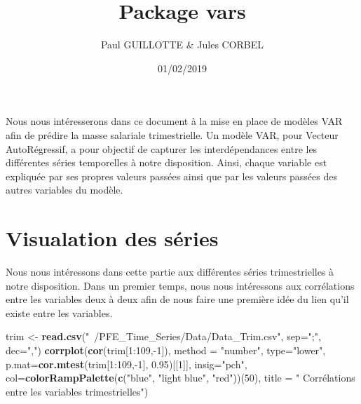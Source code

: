 \documentclass[11pt,]{article}
\title{Package vars}
\author{Paul GUILLOTTE \& Jules CORBEL}
\date{01/02/2019}
\newenvironment{Shaded}{\begin{snugshade}}{\end{snugshade}}
\newcommand{\KeywordTok}[1]{\textcolor[rgb]{0.13,0.29,0.53}{\textbf{{#1}}}}
\newcommand{\DataTypeTok}[1]{\textcolor[rgb]{0.13,0.29,0.53}{{#1}}}
\newcommand{\DecValTok}[1]{\textcolor[rgb]{0.00,0.00,0.81}{{#1}}}
\newcommand{\FloatTok}[1]{\textcolor[rgb]{0.00,0.00,0.81}{{#1}}}
\newcommand{\StringTok}[1]{\textcolor[rgb]{0.31,0.60,0.02}{{#1}}}
\newcommand{\NormalTok}[1]{{#1}}
\begin{document}
\maketitle

{
\setcounter{tocdepth}{2}
\tableofcontents
}
Nous nous intéresserons dans ce document à la mise en place de modèles
VAR afin de prédire la masse salariale trimestrielle. Un modèle VAR,
pour Vecteur AutoRégressif, a pour objectif de capturer les
interdépendances entre les différentes séries temporelles à notre
disposition. Ainsi, chaque variable est expliquée par ses propres
valeurs passées ainsi que par les valeurs passées des autres variables
du modèle.

\section{Visualation des séries}\label{visualation-des-series}

Nous nous intéressons dans cette partie aux différentes séries
trimestrielles à notre disposition. Dans un premier temps, nous nous
intéressons aux corrélations entre les variables deux à deux afin de
nous faire une première idée du lien qu'il existe entre les variables.

\begin{Shaded}
\begin{Highlighting}[]
\NormalTok{trim <-}\StringTok{ }\KeywordTok{read.csv}\NormalTok{(}\StringTok{"~/PFE_Time_Series/Data/Data_Trim.csv"}\NormalTok{, }\DataTypeTok{sep=}\StringTok{";"}\NormalTok{, }\DataTypeTok{dec=}\StringTok{","}\NormalTok{)}
\KeywordTok{corrplot}\NormalTok{(}\KeywordTok{cor}\NormalTok{(trim[}\DecValTok{1}\NormalTok{:}\DecValTok{109}\NormalTok{,-}\DecValTok{1}\NormalTok{]), }\DataTypeTok{method =} \StringTok{"number"}\NormalTok{, }\DataTypeTok{type=}\StringTok{"lower"}\NormalTok{,}
         \DataTypeTok{p.mat=}\KeywordTok{cor.mtest}\NormalTok{(trim[}\DecValTok{1}\NormalTok{:}\DecValTok{109}\NormalTok{,-}\DecValTok{1}\NormalTok{], }\FloatTok{0.95}\NormalTok{)[[}\DecValTok{1}\NormalTok{]], }\DataTypeTok{insig=}\StringTok{"pch"}\NormalTok{,}
         \DataTypeTok{col=}\KeywordTok{colorRampPalette}\NormalTok{(}\KeywordTok{c}\NormalTok{(}\StringTok{"blue"}\NormalTok{, }\StringTok{"light blue"}\NormalTok{, }\StringTok{"red"}\NormalTok{))(}\DecValTok{50}\NormalTok{), }\DataTypeTok{title =} \StringTok{"}
\StringTok{         Corrélations entre les variables trimestrielles"}\NormalTok{)}
\end{Highlighting}
\end{Shaded}
\end{document}
